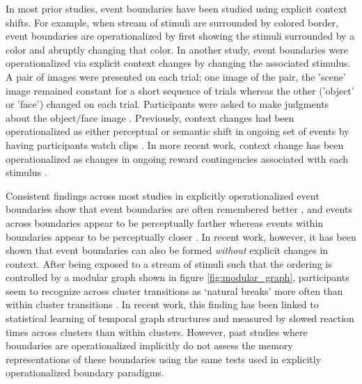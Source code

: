 In most prior studies, event boundaries have been studied using explicit context shifts. For example, when stream of stimuli are surrounded by colored border, event boundaries are operationalized by first showing the stimuli surrounded by a color and abruptly changing that color\cite{heusser2018perceptual}. In another study, event boundaries were operationalized via explicit context changes by changing the associated stimulus\cite{ezzyat2014similarity}. A pair of images were presented on each trial; one image of the pair, the 'scene' image remained constant for a short sequence of trials whereas the other ('object' or 'face') changed on each trial. Participants were asked to make judgments about the object/face image \cite{ezzyat2014similarity}. Previously, context changes had been operationalized as either perceptual or semantic shift in ongoing set of events by having participants watch clips \cite{swallow2009event}. In more recent work, context change has been operationalized as changes in ongoing reward contingencies associated with each stimulus \cite{rouhani2020reward}. 

Consistent findings across most studies in explicitly operationalized event boundaries show that event boundaries are often remembered better \cite{swallow2009event, radvansky2017event, heusser2018perceptual,clewett2019transcending, rouhani2020reward,ezzyat2014similarity,baldassano2017discovering}, and events across boundaries appear to be perceptually farther whereas events within boundaries appear to be perceptually closer \cite{clewett2019transcending,ezzyat2014similarity,brunec2018boundaries,lositsky2016neural}. In recent work, however, it has been shown that event boundaries can also be formed \textit{without} explicit changes in context. After being exposed to a stream of stimuli such that the ordering is controlled by a modular graph shown in figure \ref{fig:modular_graph}, participants seem to recognize across cluster transitions as `natural breaks' more often than within cluster transitions \cite{schapiro2013neural}. In recent work, this finding has been linked to statistical learning of temporal graph structures \cite{karuza2022value,karuza2019human,kahn2018network,kahn2018network,lynn2020abstract,lynn2020human,lynn2020humans} and measured by slowed reaction times across clusters than within clusters. However, past studies where boundaries are operationalized implicitly do not assess the memory representations of these boundaries using the same tests used in explicitly operationalized boundary paradigms. 

